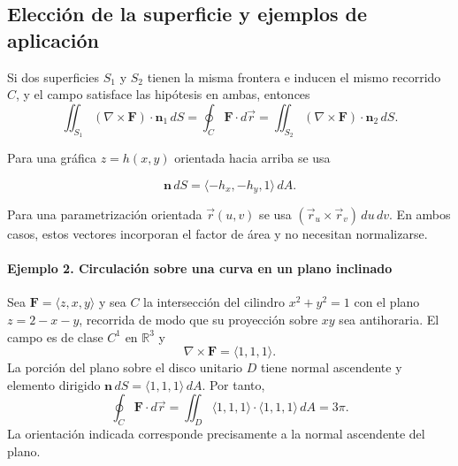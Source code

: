 \begin{center}
\begin{minipage}{.94\textwidth}
\centering
\begingroup\shorthandoff{>}
\endgroup
\end{minipage}
\end{center}

\subsection{Elección de la superficie y ejemplos de aplicación}

Si dos superficies $S_1$ y $S_2$ tienen la misma frontera e inducen el mismo recorrido $C$, y el campo satisface las hipótesis en ambas, entonces
\[
\iint_{S_1}(\nabla\times\mathbf F)\cdot\mathbf n_1\,dS
=\oint_C\mathbf F\cdot d\vec r
=\iint_{S_2}(\nabla\times\mathbf F)\cdot\mathbf n_2\,dS.
\]

Para una gráfica $z=h(x,y)$ orientada hacia arriba se usa

\[
\mathbf n\,dS=\langle-h_x,-h_y,1\rangle\,dA.
\]

Para una parametrización orientada $\vec r(u,v)$ se usa $(\vec r_u\times\vec r_v)\,du\,dv$. En ambos casos, estos vectores incorporan el factor de área y no necesitan normalizarse.

\paragraph{Ejemplo 2. Circulación sobre una curva en un plano inclinado}
Sea $\mathbf F=\langle z,x,y\rangle$ y sea $C$ la intersección del cilindro $x^2+y^2=1$ con el plano $z=2-x-y$, recorrida de modo que su proyección sobre $xy$ sea antihoraria. El campo es de clase $C^1$ en $\mathbb R^3$ y
\[
\nabla\times\mathbf F=\langle1,1,1\rangle.
\]
La porción del plano sobre el disco unitario $D$ tiene normal ascendente y elemento dirigido $\mathbf n\,dS=\langle1,1,1\rangle\,dA$. Por tanto,
\[
\oint_C\mathbf F\cdot d\vec r
=\iint_D\langle1,1,1\rangle\cdot\langle1,1,1\rangle\,dA
=3\pi.
\]
La orientación indicada corresponde precisamente a la normal ascendente del plano.


